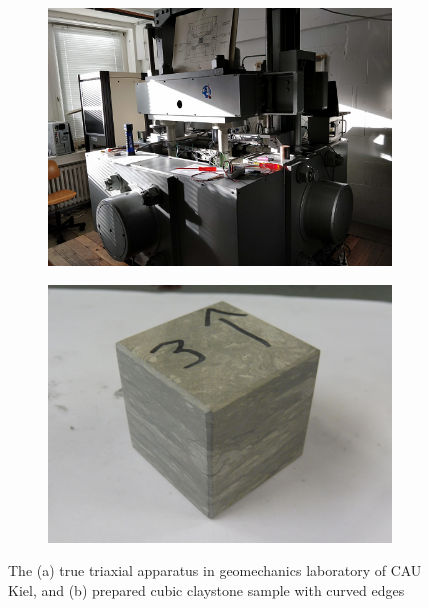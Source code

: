 \begin{figure}[!ht]
\begin{subfigure}[c]{0.48\textwidth}
\includegraphics[width=1\textwidth]{figures/Amir_TrueTriaxial_Apparatus.png}
\subcaption{}
\label{fig:Amir_TrueTriaxial_Apparatus}
\end{subfigure}
\hfill
\begin{subfigure}[c]{0.48\textwidth}
\includegraphics[width=1\textwidth]{figures/Amir_TrueTriaxial_Sample.png}
\subcaption{}
\label{fig:Amir_TrueTriaxial_Sample}
\end{subfigure}
\caption{The (a) true triaxial apparatus in geomechanics laboratory of CAU Kiel, and (b) prepared cubic claystone sample with curved edges}
\end{figure}

